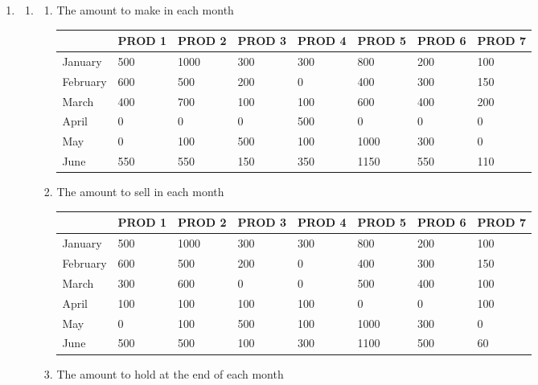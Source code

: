 \documentclass[12pt,a4paper]{article}
\makeatletter
\newtheorem*{solution}{Solution}
\theoremstyle{definition}
\renewenvironment{solution}[1][Solution] {\par\pushQED{\qed}\normalfont\topsep6\p@\@plus6\p@\relax\trivlist\item[\hskip\labelsep\bfseries#1\@addpunct{.}]\ignorespaces}{\popQED\endtrivlist\@endpefalse} \makeatother
\makeatother
\begin{document}
\begin{enumerate}
\begin{solution}
\begin{enumerate}
\begin{table}[htbp]
		\end{table}
	\item \begin{enumerate}
		\item The amount to make in each month
		\begin{table}[htbp]
			\scriptsize
			\centering
			\renewcommand\arraystretch{1.1}
			\begin{tabular}{m{} m{}<{\centering} m{}<{\centering} m{}<{\centering} m{}<{\centering} m{}<{\centering} m{}<{\centering} m{}<{\centering}}
				\hline
				& \textbf{PROD 1} & \textbf{PROD 2} & \textbf{PROD 3} & \textbf{PROD 4} & \textbf{PROD 5} & \textbf{PROD 6} &  \textbf{PROD 7} \\\hline
				January & 500 & 1000 & 300 & 300 & 800 & 200 & 100 \\
				February & 600 & 500 & 200 & 0 & 400 & 300 & 150 \\
				March & 400 & 700 & 100 & 100 & 600 & 400 & 200 \\
				April & 0 & 0 & 0 & 500 & 0 & 0 & 0 \\
				May & 0 & 100 & 500 & 100 & 1000 & 300 & 0 \\
				June & 550 & 550 & 150 & 350 & 1150 & 550 & 110 \\
				\hline
			\end{tabular}
		\end{table}
	\item The amount to sell in each month
	\begin{table}[htbp]
		\scriptsize
		\centering
		\renewcommand\arraystretch{1.1}
		\begin{tabular}{m{} m{}<{\centering} m{}<{\centering} m{}<{\centering} m{}<{\centering} m{}<{\centering} m{}<{\centering} m{}<{\centering}}
			\hline
			& \textbf{PROD 1} & \textbf{PROD 2} & \textbf{PROD 3} & \textbf{PROD 4} & \textbf{PROD 5} & \textbf{PROD 6} &  \textbf{PROD 7} \\\hline
			January & 500 & 1000 & 300 & 300 & 800 & 200 & 100 \\
			February & 600 & 500 & 200 & 0 & 400 & 300 & 150 \\
			March & 300 & 600 & 0 & 0 & 500 & 400 & 100 \\
			April & 100 & 100 & 100 & 100 & 0 & 0 & 100 \\
			May & 0 & 100 & 500 & 100 & 1000 & 300 & 0 \\
			June & 500 & 500 & 100 & 300 & 1100 & 500 & 60 \\
			\hline
		\end{tabular}
	\end{table}
\newline
	\item The amount to hold at the end of each month
	

\end{enumerate}
\end{enumerate}
\end{solution}
\end{enumerate}
\end{document}
